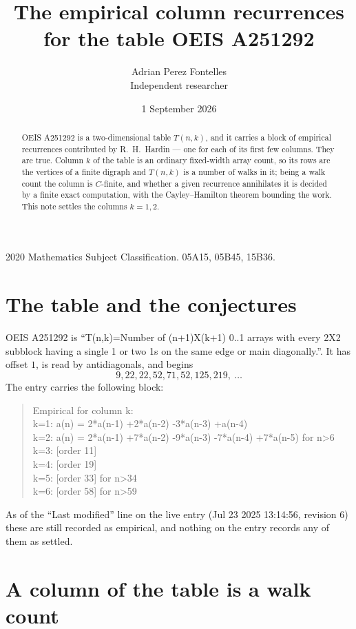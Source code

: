\documentclass[11pt,a4paper]{article}
\title{The empirical column recurrences for the table OEIS A251292}
\author{Adrian Perez Fontelles\\ \small Independent researcher}
\date{1 September 2026}
\theoremstyle{plain}
\theoremstyle{definition}
\begin{document}
\maketitle

\begin{abstract}
OEIS A251292 is a two-dimensional table $T(n,k)$, and it carries a block of empirical
recurrences contributed by R.~H.~Hardin --- one for each of its first few columns. They are
true. Column $k$ of the table is an ordinary fixed-width array count, so its rows are the
vertices of a finite digraph and $T(n,k)$ is a number of walks in it; being a walk count the
column is $C$-finite, and whether a given recurrence annihilates it is decided by a finite
exact computation, with the Cayley--Hamilton theorem bounding the work. This note settles the
columns $k=1, 2$.
\end{abstract}

\noindent\small 2020 Mathematics Subject Classification. 05A15, 05B45, 15B36.\normalsize

\section{The table and the conjectures}

OEIS A251292 is ``T(n,k)=Number of (n+1)X(k+1) 0..1 arrays with every 2X2 subblock having a single 1 or two 1s on the same edge or main diagonally.''. It has offset $1$, is
read by antidiagonals, and begins
\[
9, 22, 22, 52, 71, 52, 125, 219,\ \dots
\]
The entry carries the following block:
\begin{quote}\small
Empirical for column k:\\
k=1: a(n) = 2*a(n-1) +2*a(n-2) -3*a(n-3) +a(n-4)\\
k=2: a(n) = 2*a(n-1) +7*a(n-2) -9*a(n-3) -7*a(n-4) +7*a(n-5) for n>6\\
k=3: [order 11]\\
k=4: [order 19]\\
k=5: [order 33] for n>34\\
k=6: [order 58] for n>59\\
\end{quote}
As of the ``Last modified'' line on the live entry (Jul 23 2025 13:14:56, revision 6) these are still
recorded as empirical, and nothing on the entry records any of them as settled.

\section{A column of the table is a walk count}
\end{document}
